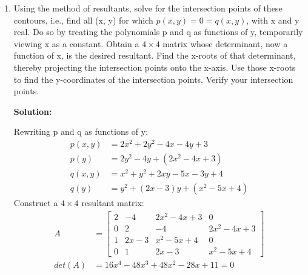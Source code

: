 \documentclass[conference,onecolumn]{IEEEtran}
\begin{document}
\begin{enumerate}[label=\arabic{enumi}.]
\begin{enumerate}
              \item Using the method of resultants, solve for the intersection points of these contours, i.e., find all (x, y) for which $p(x, y) = 0 = q(x, y)$, with x and y real.
                    Do so by treating the polynomials p and q as functions of y, temporarily viewing x as a constant.
                    Obtain a $4 \times 4$ matrix whose determinant, now a function of x, is the desired resultant.
                    Find the x-roots of that determinant, thereby projecting the intersection points onto the x-axis.
                    Use those x-roots to find the y-coordinates of the intersection points.
                    Verify your intersection points.

                    \textbf{Solution:}

                    Rewriting p and q as functions of y:
                    \begin{align*}
                        p(x, y) & = 2 x^2 + 2 y^2 - 4x - 4y + 3      \\
                        p(y)    & = 2 y^2 - 4y + (2 x^2 - 4x + 3)    \\
                        q(x, y) & = x^2 + y^2 + 2xy - 5x - 3y + 4    \\
                        q(y)    & = y^2 + (2x - 3)y + (x^2 - 5x + 4)
                    \end{align*}
                    Construct a $4 \times 4$ resultant matrix:
                    \begin{align*}
                        A      & =
                        \begin{bmatrix}
                            2 & -4     & 2 x^2 - 4x + 3 & 0              \\
                            0 & 2      & -4             & 2 x^2 - 4x + 3 \\
                            1 & 2x - 3 & x^2 - 5x + 4   & 0              \\
                            0 & 1      & 2x - 3         & x^2 - 5x + 4
                        \end{bmatrix}                          \\
                        det(A) & = 16 x^4 - 48 x^3 + 48 x^2 - 28 x + 11 = 0
                    \end{align*}


\end{enumerate}
\end{enumerate}
\end{document}
